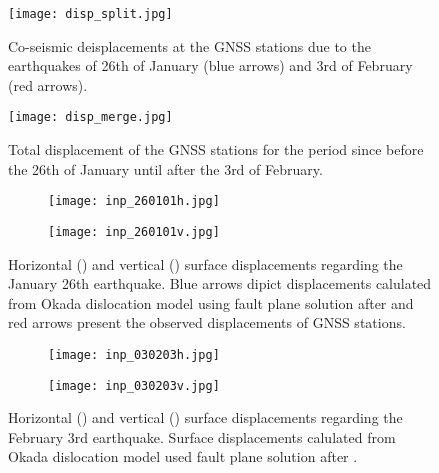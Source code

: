 \begin{extsum}
\begin{figure}[H]
  \begin{center}
    \texttt{[image: disp\_split.jpg]}
    \caption{Co-seismic deisplacements at the GNSS stations due to the earthquakes of 26th of January (blue arrows) and 3rd of February (red arrows).}
    \label{fig_e:disp_split}
  \end{center}
\end{figure}

\begin{figure}[H]
  \begin{center}
    \texttt{[image: disp\_merge.jpg]}
    \caption{Total displacement of the GNSS stations for the period since before the 26th of January until after the 3rd of February.}
    \label{fig_e:disp_merge}
  \end{center}
\end{figure}

\begin{figure}[H]
\centering
\begin{subfigure}{.49\textwidth}
  \centering
      \texttt{[image: inp\_260101h.jpg]}
      \caption{}
      \label{fig_e:inp_260101h}
\end{subfigure}
\begin{subfigure}{.49\textwidth}
\centering
      \texttt{[image: inp\_260101v.jpg]}
      \caption{}
      \label{fig_e:inp_260101v}
\end{subfigure}
\caption{Horizontal () and vertical () surface displacements regarding the January 26th earthquake. Blue  arrows dipict displacements calulated from Okada dislocation model using fault plane solution after \citet{Ganas2015} and red arrows present the observed displacements of GNSS stations.}
\label{fig_e:inp_260101}
\end{figure}

\begin{figure}[H]
\centering
\begin{subfigure}{.49\textwidth}
  \centering
      \texttt{[image: inp\_030203h.jpg]}
      \caption{}
      \label{fig_e:inp_030203h}
\end{subfigure}
\begin{subfigure}{.49\textwidth}
\centering
      \texttt{[image: inp\_030203v.jpg]}
      \caption{}
      \label{fig_e:inp_030203v}
\end{subfigure}
\caption{Horizontal () and vertical () surface displacements regarding the February 3rd earthquake. Surface displacements calulated from Okada dislocation model used fault plane solution after \citet{Boncori2015}.}
\label{fig_e:inp_030203}
\end{figure}


\end{extsum}
